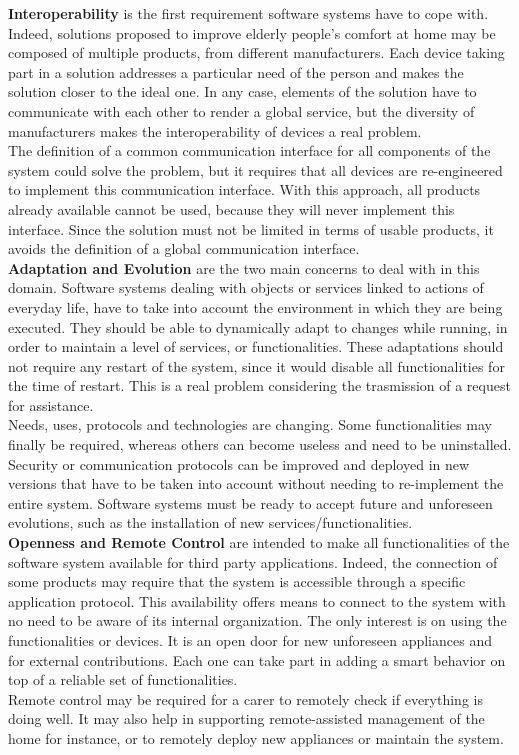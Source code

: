 {\bf Interoperability} is the first requirement software systems have to cope with. Indeed, solutions proposed to improve elderly people's comfort at home may be composed of multiple products, from different manufacturers. Each device taking part in a solution addresses a particular need of the person and makes the solution closer to the ideal one. In any case, elements of the solution have to communicate with each other to render a global service, but the diversity of manufacturers makes the interoperability of devices a real problem.\\
The definition of a common communication interface for all components of the system could solve the problem, but it requires that all devices are re-engineered to implement this communication interface. With this approach, all products already available cannot be used, because they will never implement this interface. Since the solution must not be limited in terms of usable products, it avoids the definition of a global communication interface.\\

{\bf Adaptation and Evolution} are the two main concerns to deal with in this domain. Software systems dealing with objects or services linked to actions of everyday life, have to take into account the environment in which they are being executed. They should be able to dynamically adapt to changes while running, in order to maintain a level of services, or functionalities. These adaptations should not require any restart of the system, since it would disable all functionalities for the time of restart. This is a real problem considering the trasmission of a request for assistance.\\
Needs, uses, protocols and technologies are changing. Some functionalities may finally be required, whereas others can become useless and need to be uninstalled. Security or communication protocols can be improved and deployed in new versions that have to be taken into account without needing to re-implement the entire system. Software systems must be ready to accept future and unforeseen evolutions, such as the installation of new services/functionalities.\\

{\bf Openness and Remote Control} are intended to make all functionalities of the software system available for third party applications. Indeed, the connection of some products may require that the system is accessible through a specific application protocol. This availability offers means to connect to the system with no need to be aware of its internal organization. The only interest is on using the functionalities or devices. It is an open door for new unforeseen appliances and for external contributions. Each one can take part in adding a smart behavior on top of a reliable set of functionalities.\\
Remote control may be required for a carer to remotely check if everything is doing well. It may also help in supporting remote-assisted management of the home for instance, or to remotely deploy new appliances or maintain the system.\\

